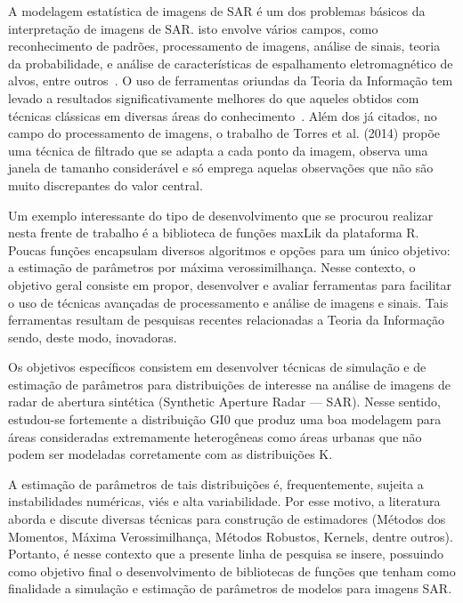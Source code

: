 \documentclass[12pt,letterpaper]{article}
\begin{document}
	A modelagem estatística de imagens de SAR é um dos problemas básicos da interpretação de imagens de SAR. isto envolve vários campos, como reconhecimento de padrões, processamento de imagens, análise de sinais, teoria da probabilidade,
e análise de características de espalhamento eletromagnético de alvos, entre outros~\cite{Gao2010StatisticalMO}.
O uso de ferramentas oriundas da Teoria da Informação tem levado a resultados significativamente melhores do que aqueles obtidos com técnicas clássicas em diversas áreas do conhecimento~\cite{InformationTheory}. Além dos já citados, no campo do processamento de imagens, o trabalho de Torres et al. (2014) propõe uma técnica de filtrado que se adapta a cada ponto da imagem, observa uma janela de tamanho considerável e só emprega aquelas observações que não são muito discrepantes do valor central. 

Um exemplo interessante do tipo de desenvolvimento que se procurou realizar nesta frente de trabalho é a biblioteca de funções maxLik da plataforma R. Poucas funções encapsulam diversos algoritmos e opções para um único objetivo: a estimação de parâmetros por máxima verossimilhança. Nesse contexto, o objetivo geral consiste em propor, desenvolver e avaliar ferramentas para facilitar o uso de técnicas avançadas de processamento e análise de imagens e sinais. Tais ferramentas resultam de pesquisas recentes relacionadas a Teoria da Informação sendo, deste modo, inovadoras.

Os objetivos específicos consistem em desenvolver técnicas de simulação e de estimação de parâmetros para distribuições de interesse na análise de imagens de radar de abertura sintética (Synthetic Aperture Radar — SAR). Nesse sentido, estudou-se fortemente a distribuição GI0 que produz uma boa modelagem para áreas consideradas extremamente heterogêneas como áreas urbanas que não podem ser modeladas corretamente com as distribuições K.

	A estimação de parâmetros de tais distribuições é, frequentemente, sujeita a instabilidades numéricas, viés e alta variabilidade. Por esse motivo, a literatura aborda e discute diversas técnicas para construção de estimadores (Métodos dos Momentos, Máxima Verossimilhança, Métodos Robustos, Kernels, dentre outros).
	Portanto, é nesse contexto que a presente linha de pesquisa se insere, possuindo como objetivo final o desenvolvimento de bibliotecas de funções que tenham como finalidade a simulação e estimação de parâmetros de modelos para imagens SAR.


\end{document}
